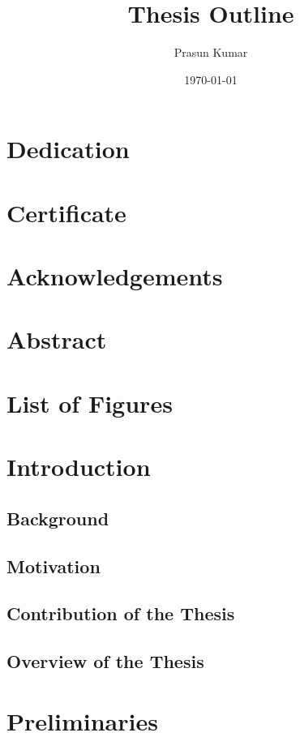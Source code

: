 \documentclass[11pt]{article}
\title{Thesis Outline}
\author{Prasun Kumar}
\date{\today}
\begin{document}
\maketitle

\tableofcontents 

\section*{Dedication}

\section*{Certificate}
 
\section*{Acknowledgements}

\section*{Abstract}

\section*{List of Figures}

\section{Introduction}

   \subsection{Background}
   
   \subsection{Motivation}
  
   \subsection{Contribution of the Thesis}

   \subsection{Overview of the Thesis}

\section{Preliminaries}
\end{document}
